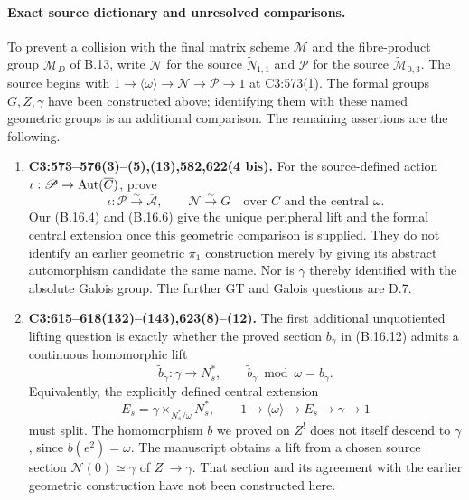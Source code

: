 \paragraph{Exact source dictionary and unresolved comparisons.}
To prevent a collision with the final matrix scheme $\mathcal M$
and the fibre-product group $\mathcal M_D$ of B.13, write
$\mathscr N$ for the source $\widetilde N_{1,1}$ and
$\mathscr P$ for the source $\widetilde{\mathcal M}_{0,3}$.
The source begins with
$1\to\langle\omega\rangle\to\mathscr N\to\mathscr P\to1$
at C3:573(1). The formal groups $G,Z,\gamma$ have been constructed
above; identifying them with these named geometric groups is
an additional comparison. The remaining assertions are the following.

\begin{enumerate}
\item[(R1)] \textbf{C3:573--576(3)--(5),(13),582,622(4 bis).}
For the source-defined action
$\iota:\mathscr P\to\operatorname{Aut}(\overline C)$, prove
\[
       \iota:\mathscr P\xrightarrow{\sim}\overline{\mathcal A},
       \qquad \mathscr N\xrightarrow{\sim}G
       \quad\text{over }C\text{ and the central }\omega.
 \tag{B.16.R1}
\]
Our (B.16.4) and (B.16.6) give the unique peripheral lift and
the formal central extension once this geometric comparison
is supplied. They do not identify an earlier geometric
$\pi_1$ construction merely by giving its abstract automorphism
candidate the same name. Nor is $\gamma$ thereby identified
with the absolute Galois group. The further GT and Galois
questions are D.7.

\item[(R2)] \textbf{C3:615--618(132)--(143),623(8)--(12).}
The first additional unquotiented lifting question is exactly
whether the proved section $b_\gamma$ in (B.16.12) admits a
continuous homomorphic lift
\[
 \widetilde b_\gamma:\gamma\longrightarrow N_s^*,
 \qquad\widetilde b_\gamma\bmod\omega=b_\gamma.
 \tag{B.16.R2}
\]
Equivalently, the explicitly defined central extension
\[
 E_s=\gamma\times_{N_s^*/\omega}N_s^*,
 \qquad1\to\langle\omega\rangle\to E_s\to\gamma\to1
 \tag{B.16.R2a}
\]
must split. The homomorphism $b$ we proved on $Z^!$ does not
itself descend to $\gamma$, since $b(e^2)=\omega$.
The manuscript obtains a lift from a chosen source section
$\mathscr N(0)\simeq\gamma$ of $Z^!\to\gamma$.
That section and its agreement with the earlier geometric
construction have not been constructed here.


\end{enumerate}
